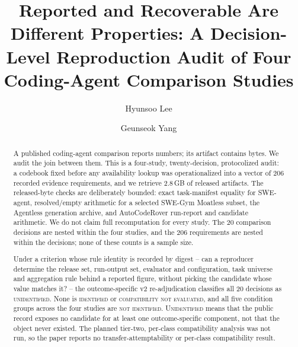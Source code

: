 \documentclass[acmsmall,screen,review,anonymous]{acmart}
\begin{document}
\title{Reported and Recoverable Are Different Properties:
A Decision-Level Reproduction Audit of Four Coding-Agent Comparison Studies}

\author{Hyunsoo Lee}

\author{Geunseok Yang}

\begin{abstract}
A published coding-agent comparison reports numbers; its artifact contains bytes. We audit
the join between them. This is a four-study, twenty-decision, protocolized audit: a codebook
fixed before any availability lookup was operationalized into a vector of 206 recorded
evidence requirements, and we retrieve 2.8\,GB of released artifacts. The released-byte
checks are deliberately bounded: exact task-manifest equality for SWE-agent, resolved/empty
arithmetic for a selected SWE-Gym Moatless subset, the Agentless generation archive, and
AutoCodeRover run-report and candidate arithmetic. We do not claim full recomputation
for every study. The 20 comparison decisions are nested within the four studies, and the 206
requirements are nested within the decisions; none of these counts is a sample size.

Under a criterion whose rule identity is recorded by digest -- can a reproducer determine
the release set, run-output set, evaluator and configuration, task universe and aggregation
rule behind a reported figure, without picking the candidate whose value matches it? -- the
outcome-specific v2 re-adjudication classifies all 20 decisions as \textsc{unidentified}.
None is \textsc{identified} or \textsc{compatibility not evaluated}, and all five condition
groups across the four studies are \textsc{not identified}. \textsc{Unidentified} means that
the public record exposes no candidate for at least one outcome-specific component, not that
the object never existed.
The planned tier-two, per-class compatibility analysis was not run, so the paper reports no
transfer-attemptability or per-class compatibility result.


\end{abstract}
\end{document}
